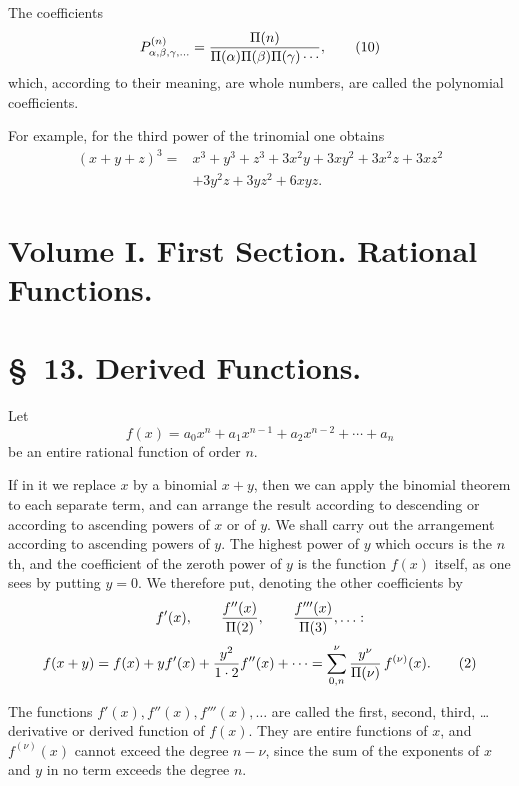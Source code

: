\documentclass[11pt]{article}
\begin{document}
The coefficients
\begin{equation}
 P_{\alpha,\beta,\gamma,\ldots}^{(n)}={\Pi(n)\over
 \Pi(\alpha)\Pi(\beta)\Pi(\gamma)\cdots},
\tag{10}
\end{equation}
which, according to their meaning, are whole numbers, are called the polynomial coefficients.

For example, for the third power of the trinomial one obtains
\begin{equation}
\begin{aligned}
(x+y+z)^3={}&x^3+y^3+z^3+3x^2y+3xy^2+3x^2z+3xz^2\\
&+3y^2z+3yz^2+6xyz.
\end{aligned}
\tag{11}
\end{equation}

\clearpage

\clearpage
\section*{Volume I. First Section. Rational Functions.}

\section*{\S~13. Derived Functions.}

Let
\begin{equation}
 f(x)=a_0x^n+a_1x^{n-1}+a_2x^{n-2}+\cdots+a_n
\tag{1}
\end{equation}
be an entire rational function of order $n$.

If in it we replace $x$ by a binomial $x+y$, then we can apply the binomial theorem to each separate term, and can arrange the result according to descending or according to ascending powers of $x$ or of $y$. We shall carry out the arrangement according to ascending powers of $y$. The highest power of $y$ which occurs is the $n$th, and the coefficient of the zeroth power of $y$ is the function $f(x)$ itself, as one sees by putting $y=0$. We therefore put, denoting the other coefficients by
\[
 f'(x),\qquad {f''(x)\over \Pi(2)},\qquad {f'''(x)\over \Pi(3)},\ldots:
\]
\begin{equation}
 f(x+y)=f(x)+yf'(x)+{y^2\over1\cdot2}f''(x)+\cdots
       =\sum_{0,n}^{\nu}{y^\nu\over\Pi(\nu)}\,f^{(\nu)}(x).
\tag{2}
\end{equation}

The functions $f'(x),f''(x),f'''(x),\ldots$ are called the first, second, third, \ldots{} derivative or derived function of $f(x)$. They are entire functions of $x$, and $f^{(\nu)}(x)$ cannot exceed the degree $n-\nu$, since the sum of the exponents of $x$ and $y$ in no term exceeds the degree $n$.
\end{document}
